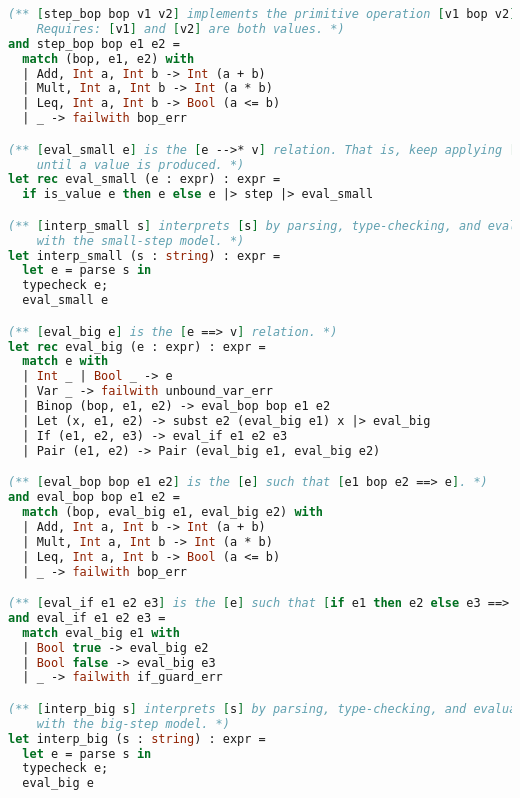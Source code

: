 \begin{lstlisting}[language=OCaml]
(** [step_bop bop v1 v2] implements the primitive operation [v1 bop v2].
    Requires: [v1] and [v2] are both values. *)
and step_bop bop e1 e2 =
  match (bop, e1, e2) with
  | Add, Int a, Int b -> Int (a + b)
  | Mult, Int a, Int b -> Int (a * b)
  | Leq, Int a, Int b -> Bool (a <= b)
  | _ -> failwith bop_err

(** [eval_small e] is the [e -->* v] relation. That is, keep applying [step]
    until a value is produced. *)
let rec eval_small (e : expr) : expr =
  if is_value e then e else e |> step |> eval_small

(** [interp_small s] interprets [s] by parsing, type-checking, and evaluating it
    with the small-step model. *)
let interp_small (s : string) : expr =
  let e = parse s in
  typecheck e;
  eval_small e

(** [eval_big e] is the [e ==> v] relation. *)
let rec eval_big (e : expr) : expr =
  match e with
  | Int _ | Bool _ -> e
  | Var _ -> failwith unbound_var_err
  | Binop (bop, e1, e2) -> eval_bop bop e1 e2
  | Let (x, e1, e2) -> subst e2 (eval_big e1) x |> eval_big
  | If (e1, e2, e3) -> eval_if e1 e2 e3
  | Pair (e1, e2) -> Pair (eval_big e1, eval_big e2)

(** [eval_bop bop e1 e2] is the [e] such that [e1 bop e2 ==> e]. *)
and eval_bop bop e1 e2 =
  match (bop, eval_big e1, eval_big e2) with
  | Add, Int a, Int b -> Int (a + b)
  | Mult, Int a, Int b -> Int (a * b)
  | Leq, Int a, Int b -> Bool (a <= b)
  | _ -> failwith bop_err

(** [eval_if e1 e2 e3] is the [e] such that [if e1 then e2 else e3 ==> e]. *)
and eval_if e1 e2 e3 =
  match eval_big e1 with
  | Bool true -> eval_big e2
  | Bool false -> eval_big e3
  | _ -> failwith if_guard_err

(** [interp_big s] interprets [s] by parsing, type-checking, and evaluating it
    with the big-step model. *)
let interp_big (s : string) : expr =
  let e = parse s in
  typecheck e;
  eval_big e

\end{lstlisting}